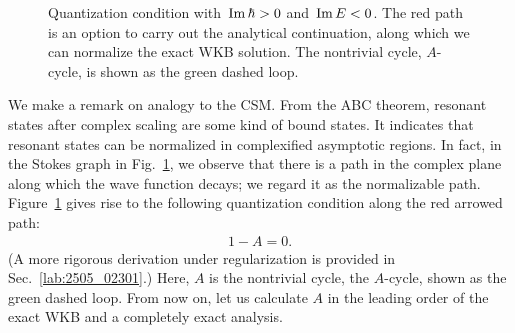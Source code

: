 \begin{figure}[t]
\caption{Quantization condition with~$\operatorname{Im}\hbar>0$ and~$\operatorname{Im} E<0$.
The red path is an option to carry out the analytical continuation,
along which we can normalize the exact WKB solution.
The nontrivial cycle, $A$-cycle, is shown as the green dashed loop.}
\label{src:2503_18741:fig:stokes_graph_path}
\end{figure}
We make a remark on analogy to the CSM. From the ABC theorem, resonant states after complex scaling are some kind of bound states. It indicates that resonant states can be normalized in complexified asymptotic regions. In fact, in the Stokes graph in Fig.~\ref{src:2503_18741:fig:stokes_graph_path}, we observe that there is a path in the complex plane along which the wave function decays; we regard it as the normalizable path.
Figure~\ref{src:2503_18741:fig:stokes_graph_path} gives rise to the following quantization condition
along the red arrowed path:
\begin{align}
    1 - A = 0 .
    \label{src:2503_18741:eq:quantization_cond}
\end{align}
(A more rigorous derivation under regularization is provided in Sec.~\ref{lab:2505_02301}.)
Here, $A$ is the nontrivial cycle, the $A$-cycle, shown as the green dashed loop.
From now on, let us calculate $A$
in the leading order of the exact WKB
and a completely exact analysis.

